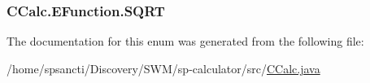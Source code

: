 \subsubsection[{\texorpdfstring{S\+Q\+RT}{SQRT}}]{\setlength{\rightskip}{0pt plus 5cm}C\+Calc.\+E\+Function.\+S\+Q\+RT}\hypertarget{enum_c_calc_1_1_e_function_a0eb88b2abee0f892a6c9c02f1e244f2e}{}\label{enum_c_calc_1_1_e_function_a0eb88b2abee0f892a6c9c02f1e244f2e}


The documentation for this enum was generated from the following file\+:\begin{DoxyCompactItemize}
\item 
/home/spsancti/\+Discovery/\+S\+W\+M/sp-\/calculator/src/\hyperlink{_c_calc_8java}{C\+Calc.\+java}\end{DoxyCompactItemize}
